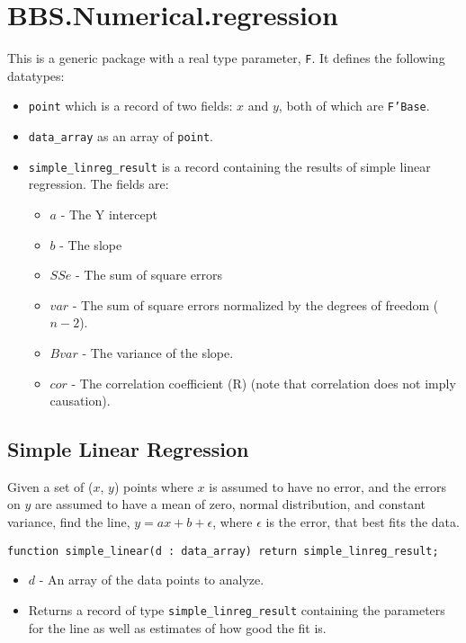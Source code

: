 \documentclass[10pt, openany]{book}
\newcommand{\datatype}[1]{\texttt{#1}}
\begin{document}
\section{BBS.Numerical.regression}
This is a generic package with a real type parameter, \datatype{F}.  It defines the following datatypes:
\begin{itemize}
  \item \datatype{point} which is a record of two fields: $x$ and $y$, both of which are \datatype{F'Base}.
  \item \datatype{data\_array} as an array of \datatype{point}.
  \item \datatype{simple\_linreg\_result} is a record containing the results of simple linear regression.  The fields are:
  \begin{itemize}
    \item $a$ - The Y intercept
    \item $b$ - The slope
    \item $SSe$ - The sum of square errors
    \item $var$ - The sum of square errors normalized by the degrees of freedom ($n-2$).
    \item $Bvar$ - The variance of the slope.
    \item $cor$ - The correlation coefficient (R) (note that correlation does not imply causation).
  \end{itemize}
\end{itemize}

\subsection{Simple Linear Regression}
Given a set of ($x$, $y$) points where $x$ is assumed to have no error, and the errors on $y$ are assumed to have a mean of zero, normal distribution, and constant variance, find the line, $y=ax+b+\epsilon$, where $\epsilon$ is the error, that best fits the data.
\begin{lstlisting}
function simple_linear(d : data_array) return simple_linreg_result;
\end{lstlisting}
\begin{itemize}
  \item $d$ - An array of the data points to analyze.
  \item Returns a record of type \datatype{simple\_linreg\_result} containing the parameters for the line as well as estimates of how good the fit is.
\end{itemize}
\end{document}
